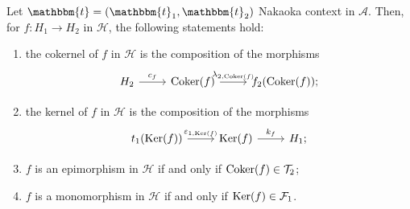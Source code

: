\begin{corollary}\label{cor:2.3}
  Let $\mathbbm{t}=(\mathbbm{t}_1,\mathbbm{t}_2)$ Nakaoka context in $\mathscr{A}$.
  Then, for $f:H_1\to H_2$ in $\mathcal{H}$, the following statements hold:
  \begin{enumerate}[label=(\alph*),ref=(\alph*)]
    \item\label{cor:2.3:a} the cokernel of $f$ in $\mathcal{H}$ is the composition of the morphisms
      \begin{equation*}
        \begin{tikzcd}
          H_2\arrow{r}{c_f}&\Coker(f)\arrow{r}{\lambda_{2,\Coker(f)}}&f_2(\Coker(f));
        \end{tikzcd}
      \end{equation*}
    \item\label{cor:2.3:b} the kernel of $f$ in $\mathcal{H}$ is the composition of the morphisms
      \begin{equation*}
        \begin{tikzcd}
          t_1(\Ker(f))\arrow{r}{\varepsilon_{1,\Ker(f)}}&\Ker(f)\arrow{r}{k_f}&H_1;
        \end{tikzcd}
      \end{equation*}
    \item\label{cor:2.3:c} $f$ is an epimorphism in $\mathcal{H}$ if and only if $\operatorname{Coker}(f)\in\mathcal{T}_2$;
    \item\label{cor:2.3:d} $f$ is a monomorphism in $\mathcal{H}$ if and only if $\operatorname{Ker}(f)\in\mathcal{F}_1$.
  \end{enumerate}
\end{corollary}

